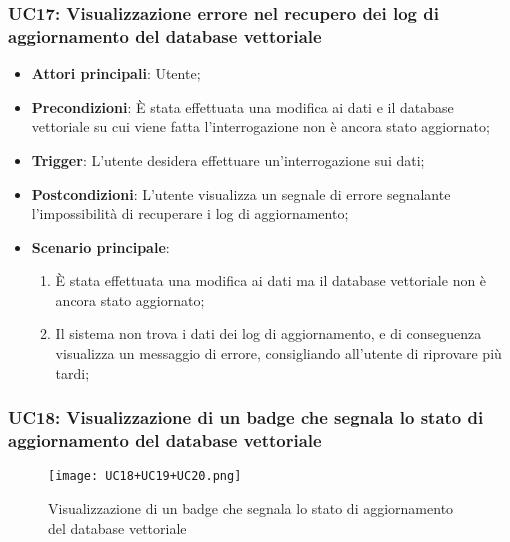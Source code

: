 \hypertarget{UC17}{}
\subsubsection{UC17: Visualizzazione errore nel recupero dei log di aggiornamento del database vettoriale}
\begin{itemize}
    \item \textbf{Attori principali}: Utente;
    \item \textbf{Precondizioni}: È stata effettuata una modifica ai dati e il database vettoriale su cui viene fatta l'interrogazione non è ancora stato aggiornato;
    \item \textbf{Trigger}: L'utente desidera effettuare un'interrogazione sui dati;
    \item \textbf{Postcondizioni}: L'utente visualizza un segnale di errore segnalante l'impossibilità di recuperare i log di aggiornamento;
    \item \textbf{Scenario principale}:
    \begin{enumerate}
        \item È stata effettuata una modifica ai dati ma il database vettoriale non è ancora stato aggiornato;
        \item Il sistema non trova i dati dei log di aggiornamento, e di conseguenza visualizza un messaggio di errore, consigliando all'utente di riprovare più tardi;
    \end{enumerate}
\end{itemize}

\newpage

\hypertarget{UC18}{}
\subsubsection{UC18: Visualizzazione di un badge che segnala lo stato di aggiornamento del database vettoriale}

\begin{figure}[h]
    \centering
    \texttt{[image: UC18+UC19+UC20.png]}
    \caption{Visualizzazione di un badge che segnala lo stato di aggiornamento del database vettoriale}
\end{figure}

